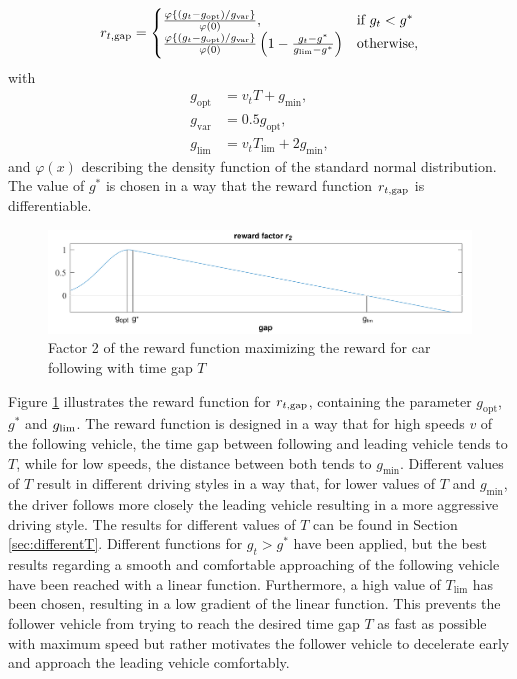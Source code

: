 \documentclass[review]{elsarticle}
\providecommand{\sub}[1]{_{\mathrm{#1}}}  %
\providecommand{\3}{{\ss}}
\begin{document}
	
	\begin{equation}
	\label{eq:r2_CFP}
	r_{t, \rm gap}  = 
	\begin{cases}
	\frac{\varphi\left\{(g_t-g\sub{opt})/g\sub{var}\right\}}{\varphi(0)}, & \text{if } g_t < g^*\\
	\frac{\varphi\left\{(g_t-g\sub{opt})/g\sub{var}\right\}}{\varphi(0)}\left(1-\frac{g_t-g^*}{g\sub{lim} - g^*}\right)  & \text{otherwise},
	\end{cases}
	\end{equation}
	with 
	\begin{align}
	g\sub{opt} &= v_tT + g\sub{min},\\
	g\sub{var} &= 0.5g\sub{opt},\\
	g\sub{lim} &= v_tT\sub{lim} + 2g\sub{min},
	\end{align}
	and $\varphi(x)$ describing the density function of the standard normal distribution. The value of $g^*$ is chosen in a way that the reward function $r_{t,\rm gap}$ is differentiable.
	\begin{figure}
		\centering
		\includegraphics[width=12cm]{images/RewardFunc1}
		\caption{Factor 2 of the reward function maximizing the reward
			for car following with time gap $T$} 
		\label{fig:RewardFunc1}
	\end{figure}
	Figure \ref{fig:RewardFunc1} illustrates the reward function for
	$r_{t,\rm gap}$, containing the parameter $g\sub{opt}$, $g^*$ and $g_{\rm
		lim}$. The reward function is designed in a way that for high speeds $v$
	of the following vehicle, the time gap between following and leading
	vehicle tends to $T$, while for low speeds, the distance
	between both tends to $g\sub{min}$. Different values of $T$
	result in different driving styles in a way that, for lower values of
	$T$ and $g\sub{min}$, the driver follows
	more closely the leading vehicle resulting in a more aggressive
	driving style. The results for different values of $T$ can
	be found in Section \ref{sec:differentT}. Different functions for $g_t
	> g^*$ have been applied, but the best results regarding a smooth and
	comfortable approaching of the following vehicle have been reached with
	a linear function. Furthermore, a high value of $T\sub{lim}$ has been
	chosen, resulting in a low gradient of the linear function. This
	prevents the follower vehicle from trying to reach the desired time gap $T$
	as fast as possible with maximum speed but rather motivates the follower vehicle to decelerate early and approach the leading vehicle comfortably.
	
\end{document}
